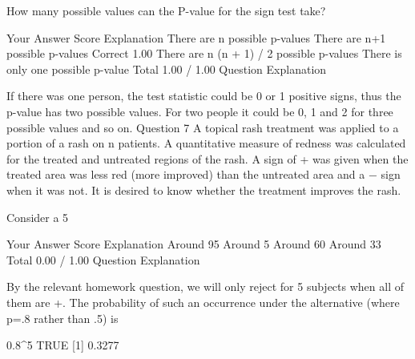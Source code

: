 How many possible values can the P-value for the sign test take?

Your Answer		Score	Explanation
There are n possible p-values			
There are n+1 possible p-values	Correct	1.00	
There are n (n + 1) / 2 possible p-values			
There is only one possible p-value			
Total		1.00 / 1.00	
Question Explanation

If there was one person, the test statistic could be 0 or 1 positive signs, thus the p-value has two possible values. For two people it could be 0, 1 and 2 for three possible values and so on.
Question 7
A topical rash treatment was applied to a portion of a rash on n patients. A quantitative measure of redness was calculated for the treated and untreated regions of the rash. A sign of + was given when the treated area was less red (more improved) than the untreated area and a − sign when it was not. It is desired to know whether the treatment improves the rash.

Consider a 5%

Your Answer		Score	Explanation
Around 95%
Around 5%
Around 60%
Around 33%
Total		0.00 / 1.00	
Question Explanation

By the relevant homework question, we will only reject for 5 subjects when all of them are +. The probability of such an occurrence under the alternative (where p=.8 rather than .5) is

0.8^5
TRUE [1] 0.3277
